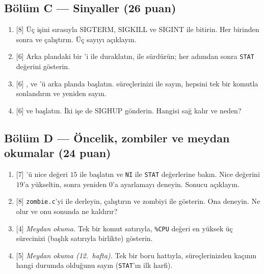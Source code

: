 \subsection*{Bölüm C --- Sinyaller (26 puan)}
\begin{enumerate}[leftmargin=2.2em,label=\textbf{C\arabic*}]
  \item {[8]} Üç  işini sırasıyla SIGTERM, SIGKILL ve SIGINT ile bitirin. Her birinden sonra  ve  çalıştırın. Üç sayıyı açıklayın.
  \item {[6]} Arka plandaki bir 'i  ile duraklatın,  ile sürdürün; her adımdan sonra \texttt{STAT} değerini gösterin.
  \item {[6]} ,  ve 'ü arka planda başlatın.  süreçlerinizi  ile sayın, hepsini tek bir komutla sonlandırın ve yeniden sayın.
  \item {[6]}  ve  başlatın. İki işe de SIGHUP gönderin. Hangisi sağ kalır ve neden?
\end{enumerate}

\subsection*{Bölüm D --- Öncelik, zombiler ve meydan okumalar (24 puan)}
\begin{enumerate}[leftmargin=2.2em,label=\textbf{D\arabic*}]
  \item {[7]} 'ü nice değeri $15$ ile başlatın ve \texttt{NI} ile \texttt{STAT} değerlerine bakın. Nice değerini $19$'a yükseltin, sonra yeniden $0$'a ayarlamayı deneyin. Sonucu açıklayın.
  \item {[8]} \texttt{zombie.c}'yi  ile derleyin,  çalıştırın ve zombiyi  ile gösterin. Ona  deneyin. Ne olur ve onu sonunda ne kaldırır?
  \item {[4]} \emph{Meydan okuma.} Tek bir komut satırıyla, \texttt{\%CPU} değeri en yüksek üç sürecinizi (başlık satırıyla birlikte) gösterin.
  \item {[5]} \emph{Meydan okuma (12.~hafta).} Tek bir boru hattıyla, süreçlerinizden kaçının hangi durumda olduğunu sayın (\texttt{STAT}'ın ilk harfi).
\end{enumerate}

